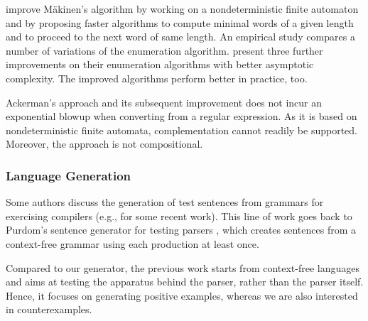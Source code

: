 \citet{DBLP:journals/tcs/AckermanS09} improve M{\"{a}}kinen's
algorithm by working on a nondeterministic finite automaton
and by proposing faster algorithms to compute minimal words of a given
length and to proceed to the next word of same length. An empirical
study compares a number of variations of the enumeration algorithm.
%
%
\citet{DBLP:conf/cocoon/AckermanM09} present three further
improvements on their enumeration algorithms with better asymptotic
complexity. The improved algorithms perform better in practice, too.

Ackerman's approach and its subsequent improvement does not incur an
exponential blowup when converting from a regular expression. As it is based on
nondeterministic finite automata, complementation cannot readily be
supported. Moreover, the approach is not compositional.





\subsubsection*{Language Generation}
Some authors discuss the generation of test sentences from grammars for
exercising compilers
(e.g., \cite{DBLP:conf/cisse/ParachaF08,DBLP:conf/compsac/ZhengW09}
for some recent work). This
line of work goes back to Purdom's sentence generator for testing
parsers \cite{purdom72:_senten_gener_testin_parser}, which creates
sentences from a context-free grammar using each production at least
once.

Compared to our generator, the previous work starts from context-free
languages and aims at testing the apparatus behind the parser,
rather than the parser itself. Hence, it focuses on generating
positive examples, whereas we are also interested in counterexamples.

